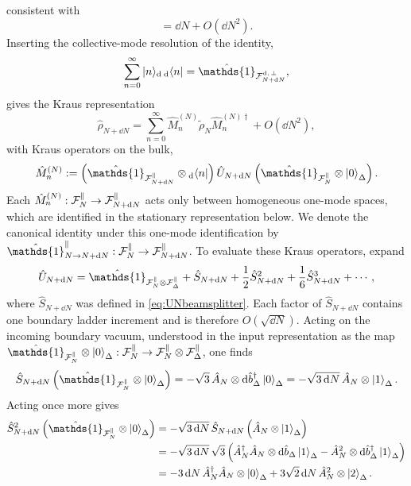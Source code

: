 \documentclass{article}
\def\cF{{\cal F}}
\newcommand{\openone}{\hat{\mathds{1}}}
\numberwithin{equation}{section}
\begin{document}
	consistent with
	\begin{equation}
		[\dd\hat b_\Delta,\dd\hat b_\Delta^\dagger] = \dd N+O(\dd N^2).
	\end{equation}
	Inserting the collective-mode resolution of the identity,
	\begin{equation}
		\sum_{n=0}^{\infty} \ket{n} \!{}_{\rm d}\,{}_{\rm d}\!\bra{n} = \openone_{\cF^{\rm d,\,\perp}_{N+\dd N}},
	\end{equation}
	gives the Kraus representation
	\begin{equation}
		\hat\rho_{N+\dd N} = \sum_{n=0}^{\infty} \hat M_n^{(N)} \tilde{\rho}_N \hat M_n^{(N)\dagger} + O(\dd N^2),
		\label{eq:KrausResolutionApp}
	\end{equation}
	with Kraus operators on the bulk,
	\begin{equation}
		\hat M_n^{(N)} := \left( \openone_{\cF_{N+\dd N}^\parallel}\otimes{}_{\rm d}\!\bra{n} \right) \hat U_{N+\dd N} \left( \openone_{\cF_N^\parallel}\otimes\ket{0}_\Delta \right).
		\label{eq:KrausDefTracingApp}
	\end{equation}
	Each \(\hat M_n^{(N)}:\cF_N^\parallel\to\cF_{N+\dd N}^\parallel\) acts only between homogeneous one-mode spaces, which are identified in the stationary representation below. We denote the canonical identity under this one-mode identification by \(\openone^\parallel_{N\to N+\dd N}:\cF_N^\parallel\to\cF_{N+\dd N}^\parallel\). To evaluate these Kraus operators, expand
	\begin{equation}
		\hat U_{N+\dd N} = \openone_{\cF_N^\parallel\otimes\cF_\Delta^\parallel} + \hat S_{N+\dd N} + \frac12\hat S_{N+\dd N}^2 + \frac{1}{6}\hat S_{N+\dd N}^3 + \cdots,
		\label{eq:UNexpansionApp}
	\end{equation}
	where \(\hat S_{N+\dd N}\) was defined in \cref{eq:UNbeamsplitter}. Each factor of \(\hat S_{N+\dd N}\) contains one boundary ladder increment and is therefore \(O(\sqrt{\dd N})\). Acting on the incoming boundary vacuum, understood in the input representation as the map \(\openone_{\cF_N^\parallel}\otimes\ket{0}_\Delta:\cF_N^\parallel\to\cF_N^\parallel\otimes\cF_\Delta^\parallel\), one finds
	\begin{equation}
		\hat S_{N+\dd N} \left( \openone_{\cF_N^\parallel}\otimes\ket{0}_\Delta \right) = -\sqrt3\,\hat A_N\otimes \dd\hat b_\Delta^\dagger\ket{0}_\Delta = -\sqrt{3\,\dd N}\, \hat A_N\otimes\ket{1}_\Delta .
		\label{eq:Son0App}
	\end{equation}
	Acting once more gives
	\begin{align}
		\hat S_{N+\dd N}^2 \left( \openone_{\cF_N^\parallel}\otimes\ket{0}_\Delta \right) &= -\sqrt{3\,\dd N}\, \hat S_{N+\dd N} \left( \hat A_N\otimes\ket{1}_\Delta \right) \nonumber\\ &= -\sqrt{3\,\dd N}\,\sqrt3 \left( \hat A_N^\dagger\hat A_N \otimes \dd\hat b_\Delta\ket{1}_\Delta - \hat A_N^2 \otimes \dd\hat b_\Delta^\dagger\ket{1}_\Delta \right) \nonumber\\ &= -3\,\dd N\, \hat A_N^\dagger\hat A_N \otimes\ket{0}_\Delta + 3\sqrt2\,\dd N\, \hat A_N^2 \otimes\ket{2}_\Delta .
		\label{eq:S2on0App}
	\end{align}
\end{document}
